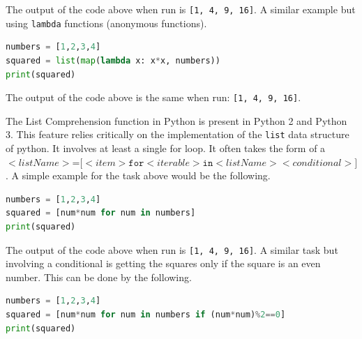 \documentclass{article}
\begin{document}
\par
The output of the code above when run is \texttt{[1, 4, 9, 16]}. A similar example but using \texttt{lambda} functions (anonymous functions).

\begin{lstlisting}[language=Python]
numbers = [1,2,3,4]
squared = list(map(lambda x: x*x, numbers))
print(squared)
\end{lstlisting}

\par
The output of the code above is the same when run: \texttt{[1, 4, 9, 16]}.

\par
The List Comprehension function in Python is present in Python 2 and Python 3. This feature relies critically on the implementation of the \texttt{list} data structure of python. It involves at least a single for loop. It often takes the form of a $<listName> \texttt{=} \texttt{[}<item> \texttt{for} <iterable> \texttt{in} <listName> <conditional>\texttt{]}$. A simple example for the task above would be the following.

\begin{lstlisting}[language=Python]
numbers = [1,2,3,4]
squared = [num*num for num in numbers]
print(squared)
\end{lstlisting}

\par
The output of the code above when run is \texttt{[1, 4, 9, 16]}. A similar task but involving a conditional is getting the squares only if the square is an even number. This can be done by the following.

\begin{lstlisting}[language=Python]
numbers = [1,2,3,4]
squared = [num*num for num in numbers if (num*num)%2==0]
print(squared)
\end{lstlisting}
\end{document}
